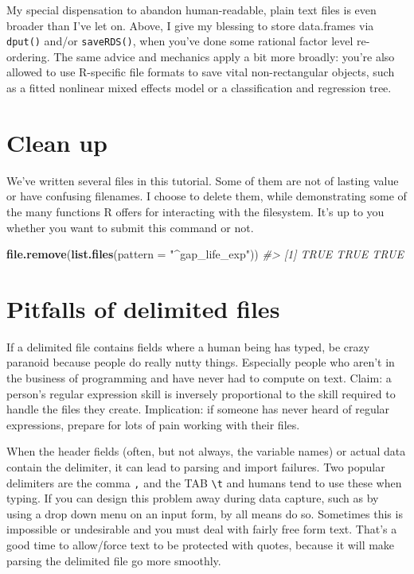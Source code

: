 \documentclass[
]{book}
\newenvironment{Shaded}{\begin{snugshade}}{\end{snugshade}}
\newcommand{\CommentTok}[1]{\textcolor[rgb]{0.56,0.35,0.01}{\textit{#1}}}
\newcommand{\DataTypeTok}[1]{\textcolor[rgb]{0.13,0.29,0.53}{#1}}
\newcommand{\KeywordTok}[1]{\textcolor[rgb]{0.13,0.29,0.53}{\textbf{#1}}}
\newcommand{\NormalTok}[1]{#1}
\newcommand{\StringTok}[1]{\textcolor[rgb]{0.31,0.60,0.02}{#1}}
\begin{document}
My special dispensation to abandon human-readable, plain text files is even broader than I've let on. Above, I give my blessing to store data.frames via \texttt{dput()} and/or \texttt{saveRDS()}, when you've done some rational factor level re-ordering. The same advice and mechanics apply a bit more broadly: you're also allowed to use R-specific file formats to save vital non-rectangular objects, such as a fitted nonlinear mixed effects model or a classification and regression tree.

\hypertarget{clean-up}{%
\section{Clean up}\label{clean-up}}

We've written several files in this tutorial. Some of them are not of lasting value or have confusing filenames. I choose to delete them, while demonstrating some of the many functions R offers for interacting with the filesystem. It's up to you whether you want to submit this command or not.

\begin{Shaded}
\begin{Highlighting}[]
\KeywordTok{file.remove}\NormalTok{(}\KeywordTok{list.files}\NormalTok{(}\DataTypeTok{pattern =} \StringTok{"^gap_life_exp"}\NormalTok{))}
\CommentTok{#> [1] TRUE TRUE TRUE}
\end{Highlighting}
\end{Shaded}

\hypertarget{pitfalls-of-delimited-files}{%
\section{Pitfalls of delimited files}\label{pitfalls-of-delimited-files}}

If a delimited file contains fields where a human being has typed, be crazy paranoid because people do really nutty things. Especially people who aren't in the business of programming and have never had to compute on text. Claim: a person's regular expression skill is inversely proportional to the skill required to handle the files they create. Implication: if someone has never heard of regular expressions, prepare for lots of pain working with their files.

When the header fields (often, but not always, the variable names) or actual data contain the delimiter, it can lead to parsing and import failures. Two popular delimiters are the comma \texttt{,} and the TAB \texttt{\textbackslash{}t} and humans tend to use these when typing. If you can design this problem away during data capture, such as by using a drop down menu on an input form, by all means do so. Sometimes this is impossible or undesirable and you must deal with fairly free form text. That's a good time to allow/force text to be protected with quotes, because it will make parsing the delimited file go more smoothly.
\end{document}
